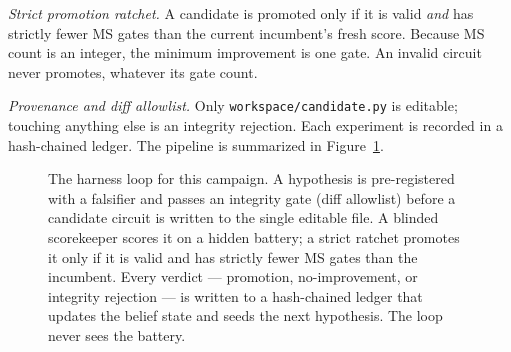 \documentclass[11pt]{article}
\begin{document}
\emph{Strict promotion ratchet.} A candidate is promoted only if it is valid
\emph{and} has strictly fewer MS gates than the current incumbent's fresh score.
Because MS count is an integer, the minimum improvement is one gate. An invalid
circuit never promotes, whatever its gate count.

\emph{Provenance and diff allowlist.} Only \texttt{workspace/candidate.py} is
editable; touching anything else is an integrity rejection. Each experiment is
recorded in a hash-chained ledger. The pipeline is summarized in
Figure~\ref{fig:harness}.

\begin{figure}[t]
\centering
{}
\caption{The harness loop for this campaign. A hypothesis is pre-registered with a
falsifier and passes an integrity gate (diff allowlist) before a candidate circuit
is written to the single editable file. A blinded scorekeeper scores it on a hidden
battery; a strict ratchet promotes it only if it is valid and has strictly fewer MS
gates than the incumbent. Every verdict --- promotion, no-improvement, or integrity
rejection --- is written to a hash-chained ledger that updates the belief state and
seeds the next hypothesis. The loop never sees the battery.}
\label{fig:harness}
\end{figure}
\end{document}
